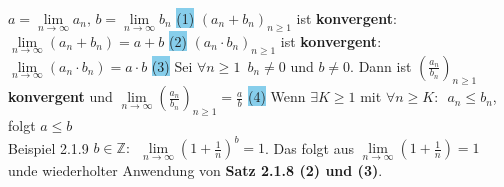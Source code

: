 \documentclass[landscape, 10pt]{article}
\begin{document}
\begin{multicols}{3}
                     \textcolor{NavyBlue}{$a=\lim\limits_{n\to\infty}a_n,\,
                     b=\lim\limits_{n\to\infty}b_n$}
                     \colorbox{SkyBlue}{(1)} 
                     \textcolor{NavyBlue}{$(a_n+b_n)_{n\geqslant 1}$} 
                     ist \textbf{konvergent}: 
                     \textcolor{NavyBlue}{$\lim\limits_{n\to\infty}(a_n+b_n)=a+b$}
                     \quad \colorbox{SkyBlue}{(2)} 
                     \textcolor{NavyBlue}{$(a_n\cdot b_n)_{n\geqslant 1}$} 
                     ist \textbf{konvergent}: 
                     \textcolor{NavyBlue}{
                     $\lim\limits_{n\to\infty}(a_n\cdot b_n)=a\cdot b$}
                     \colorbox{SkyBlue}{(3)} Sei 
                     \textcolor{NavyBlue}{$\forall n\geqslant 1\enspace b_n\neq 0$} 
                     und \textcolor{NavyBlue}{$b\neq 0$}. 
                     Dann ist 
                     \textcolor{NavyBlue}{$(\frac{a_n}{b_n})_{n\geqslant 1}$} 
                     \textbf{konvergent} und 
                     \textcolor{NavyBlue}{
                     $\lim\limits_{n\to\infty}(\frac{a_n}{b_n})_{n\geqslant 1}
                     =\frac{a}{b}$}
                     \colorbox{SkyBlue}{(4)} Wenn 
                     \textcolor{NavyBlue}{$\exists K\geqslant 1$} 
                     mit \textcolor{NavyBlue}{
                     $\forall n\geqslant K: \enspace a_n\leqslant b_n$}, 
                     folgt \textcolor{NavyBlue}{$a\leqslant b$}\\
              \colorbox{Dandelion}{Beispiel 2.1.9} 
                     \textcolor{NavyBlue}{$b\in\mathbb{Z}:\enspace
                     \lim\limits_{n\to\infty}(1+\frac{1}{n})^b=1$}.
                     Das folgt aus
                     \textcolor{NavyBlue}{
                     $\lim\limits_{n\to\infty}(1+\frac{1}{n})=1$}
                     unde wiederholter Anwendung von
                     \textbf{Satz 2.1.8 (2) und (3)}.

\end{multicols}
\end{document}
